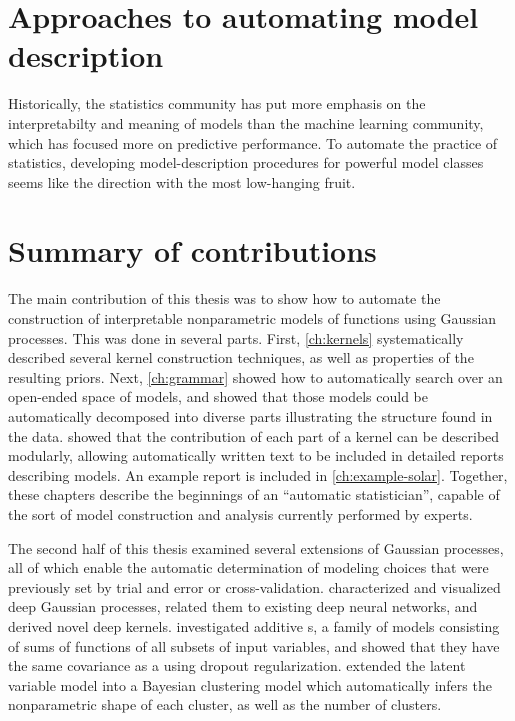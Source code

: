 \section{Approaches to automating model description}


Historically, the statistics community has put more emphasis on the interpretabilty and meaning of models than the machine learning community, which has focused more on predictive performance.
To automate the practice of statistics, developing model-description procedures for powerful model classes seems like the direction with the most low-hanging fruit.



\section{Summary of contributions}

The main contribution of this thesis was to show how to automate the construction of interpretable nonparametric models of functions using Gaussian processes.
This was done in several parts.
First, \cref{ch:kernels} systematically described several kernel construction techniques, as well as properties of the resulting \gp{} priors.
Next, \cref{ch:grammar} showed how to automatically search over an open-ended space of \gp{} models, and showed that those models could be automatically decomposed into diverse parts illustrating the structure found in the data.
 showed that the contribution of each part of a kernel can be described modularly, allowing automatically written text to be included in detailed reports describing \gp{} models.
An example report is included in \cref{ch:example-solar}.
Together, these chapters describe the beginnings of an ``automatic statistician'', capable of the sort of model construction and analysis currently performed by experts.

The second half of this thesis examined several extensions of Gaussian processes, all of which enable the automatic determination of modeling choices that were previously set by trial and error or cross-validation.
 characterized and visualized deep Gaussian processes, related them to existing deep neural networks, and derived novel deep kernels.
 investigated additive \gp{}s, a family of models consisting of sums of functions of all subsets of input variables, and showed that they have the same covariance as a \gp{} using dropout regularization.
 extended the \gp{} latent variable model into a Bayesian clustering model which automatically infers the nonparametric shape of each cluster, as well as the number of clusters.




